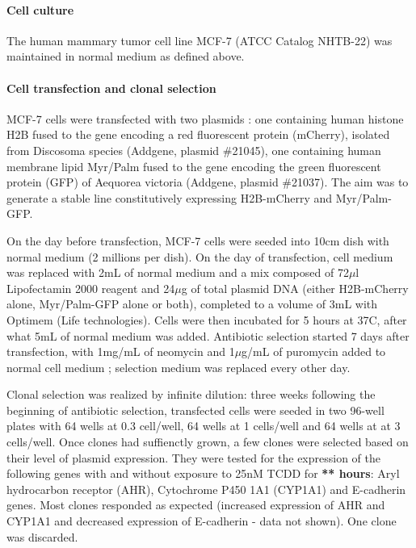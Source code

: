 \paragraph{Cell culture}
The human mammary tumor cell line MCF-7 (ATCC\up{\textregistered} Catalog NHTB-22\texttrademark)  was maintained in normal medium as defined above. %
\paragraph{Cell transfection and clonal selection}
MCF-7 cells were transfected with two plasmids : one containing human histone H2B fused to the gene encoding a red fluorescent protein (mCherry), isolated from Discosoma species (Addgene, plasmid \#21045), one containing human membrane lipid Myr/Palm fused to the gene encoding the green fluorescent protein (GFP) of Aequorea victoria (Addgene, plasmid \#21037). The aim was to generate a stable line constitutively expressing H2B-mCherry and Myr/Palm-GFP.

On the day before transfection, MCF-7 cells were seeded into 10cm dish with normal medium (2 millions per dish). On the day of transfection, cell medium was replaced with 2mL of normal medium and a mix composed of 72$\mu$l Lipofectamin\up{\textregistered} 2000 reagent and 24$\mu$g of total plasmid DNA (either H2B-mCherry alone, Myr/Palm-GFP alone or both), completed to a volume of 3mL with Optimem (Life technologies\texttrademark). Cells were then incubated for 5 hours at 37C, after what 5mL of normal medium was added. 
Antibiotic selection started 7 days after transfection, with 1mg/mL of neomycin and 1$\mu$g/mL of puromycin added to normal cell medium ; selection medium was replaced every other day.

Clonal selection was realized by infinite dilution: three weeks following the beginning of antibiotic selection, transfected cells were seeded in two 96-well plates with 64 wells at 0.3 cell/well, 64 wells at 1 cells/well and 64 wells at at 3 cells/well. Once clones had suffienctly grown, a few clones were selected based on their level of plasmid expression. They were tested for the expression of the following genes with and without exposure to 25nM TCDD for \textbf{** hours}: Aryl hydrocarbon receptor  (AHR), Cytochrome P450 1A1 (CYP1A1) and E-cadherin genes. Most clones responded as expected (increased expression of AHR and CYP1A1 and decreased expression of E-cadherin - data not shown). One clone was discarded.

